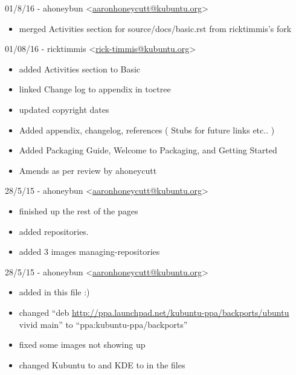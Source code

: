 \documentclass[letterpaper,10pt,english]{sphinxmanual}
\begin{document}
01/8/16 - ahoneybun \textless{}\href{mailto:aaronhoneycutt@kubuntu.org}{aaronhoneycutt@kubuntu.org}\textgreater{}
\begin{itemize}
\item {} 
merged Activities section for source/docs/basic.rst from ricktimmis's fork

\end{itemize}

01/08/16 - ricktimmis \textless{}\href{mailto:rick-timmis@kubuntu.org}{rick-timmis@kubuntu.org}\textgreater{}
\begin{itemize}
\item {} 
added Activities section to Basic

\item {} 
linked Change log to appendix in toctree

\item {} 
updated copyright dates

\item {} 
Added appendix, changelog, references ( Stubs for future links etc.. )

\item {} 
Added Packaging Guide, Welcome to Packaging, and Getting Started

\item {} 
Amends as per review by ahoneycutt

\end{itemize}

28/5/15 - ahoneybun \textless{}\href{mailto:aaronhoneycutt@kubuntu.org}{aaronhoneycutt@kubuntu.org}\textgreater{}
\begin{itemize}
\item {} 
finished up the rest of the pages

\item {} 
added repositories.

\item {} 
added 3 images managing-repositories

\end{itemize}

28/5/15 - ahoneybun \textless{}\href{mailto:aaronhoneycutt@kubuntu.org}{aaronhoneycutt@kubuntu.org}\textgreater{}
\begin{itemize}
\item {} 
added in this file :)

\item {} 
changed ``deb \url{http://ppa.launchpad.net/kubuntu-ppa/backports/ubuntu} vivid main'' to ``ppa:kubuntu-ppa/backports''

\item {} 
fixed some images not showing up

\item {} 
changed Kubuntu to  and KDE to  in the files

\end{itemize}
\end{document}
